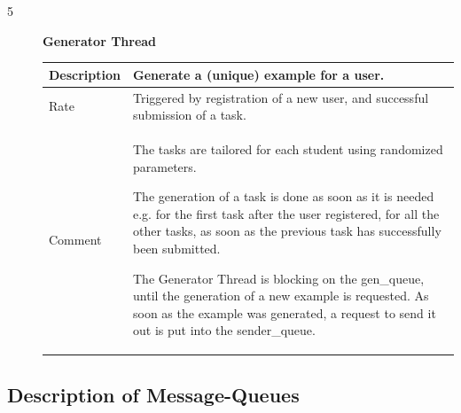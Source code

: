 \begin{description}
    \item [5] \textbf{Generator Thread} \\
    \begin{tabular}{|p{2cm}|p{11cm}|}
        \hline
        Description & Generate a (unique) example for a user. \\
        \hline
        Rate & Triggered by registration of a new user, and successful submission of a task.  \\
        \hline
        Comment & The tasks are tailored for each student using randomized parameters. 

            The generation of a task is done as soon as it is needed e.g. for the first
            task after the user registered, for all the other tasks, as soon as the previous
            task has successfully been submitted.

            The Generator Thread is blocking on the gen\_queue, until the generation of a new
            example is requested. As soon as the example was generated, a request to send it
            out is put into the sender\_queue.
        \\
        \hline
    \end{tabular}
\end{description}

\subsection{Description of Message-Queues}

